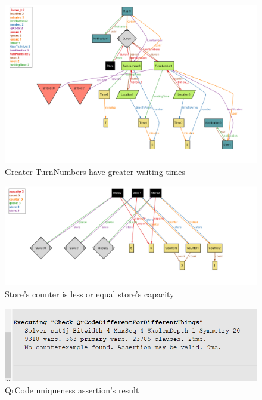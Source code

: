 \documentclass{article}
\begin{document}
\begin{figure}[H]
  \includegraphics[width=\linewidth]{waitingTime}
  \caption{Greater TurnNumbers have greater waiting times}
  
\end{figure}

\begin{figure}[H]
  \includegraphics[width=\linewidth]{storeCapacity}
  \caption{Store's counter is less or equal store's capacity}
  
\end{figure}

\begin{figure}[H]
  \includegraphics[width=\linewidth]{QrCodeAssertion}
  \caption{QrCode uniqueness assertion's result}
  
\end{figure}
\end{document}
